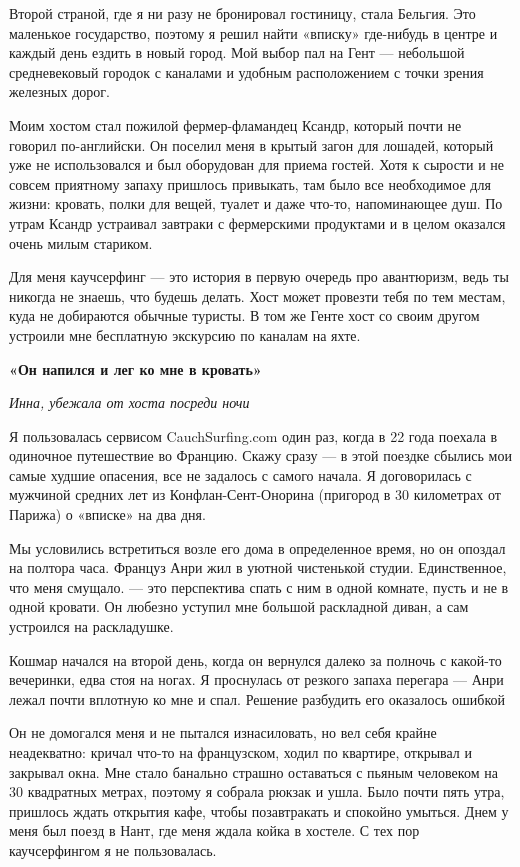 Второй страной, где я ни разу не бронировал гостиницу, стала Бельгия. Это маленькое государство, поэтому я решил найти «вписку» где-нибудь в центре и каждый день ездить в новый город. Мой выбор пал на Гент — небольшой средневековый городок с каналами и удобным расположением с точки зрения железных дорог.

Моим хостом стал пожилой фермер-фламандец Ксандр, который почти не говорил по-английски. Он поселил меня в крытый загон для лошадей, который уже не использовался и был оборудован для приема гостей. Хотя к сырости и не совсем приятному запаху пришлось привыкать, там было все необходимое для жизни: кровать, полки для вещей, туалет и даже что-то, напоминающее душ. По утрам Ксандр устраивал завтраки с фермерскими продуктами и в целом оказался очень милым стариком.

Для меня каучсерфинг — это история в первую очередь про авантюризм, ведь ты никогда не знаешь, что будешь делать. Хост может провезти тебя по тем местам, куда не добираются обычные туристы. В том же Генте хост со своим другом устроили мне бесплатную экскурсию по каналам на яхте.

\textbf{«Он напился и лег ко мне в кровать»}

\textit{Инна, убежала от хоста посреди ночи}

Я пользовалась сервисом CauchSurfing.com один раз, когда в 22 года поехала в одиночное путешествие во Францию. Скажу сразу — в этой поездке сбылись мои самые худшие опасения, все не задалось с самого начала. Я договорилась с мужчиной средних лет из Конфлан-Сент-Онорина (пригород в 30 километрах от Парижа) о «вписке» на два дня.

Мы условились встретиться возле его дома в определенное время, но он опоздал на полтора часа. Француз Анри жил в уютной чистенькой студии. Единственное, что меня смущало. — это перспектива спать с ним в одной комнате, пусть и не в одной кровати. Он любезно уступил мне большой раскладной диван, а сам устроился на раскладушке.

\begin{center}
    \Large
    Кошмар начался на второй день, когда он вернулся далеко за полночь с какой-то вечеринки, едва стоя на ногах. Я проснулась от резкого запаха перегара — Анри лежал почти вплотную ко мне и спал. Решение разбудить его оказалось ошибкой
\end{center}

Он не домогался меня и не пытался изнасиловать, но вел себя крайне неадекватно: кричал что-то на французском, ходил по квартире, открывал и закрывал окна. Мне стало банально страшно оставаться с пьяным человеком на 30 квадратных метрах, поэтому я собрала рюкзак и ушла. Было почти пять утра, пришлось ждать открытия кафе, чтобы позавтракать и спокойно умыться. Днем у меня был поезд в Нант, где меня ждала койка в хостеле. С тех пор каучсерфингом я не пользовалась.

